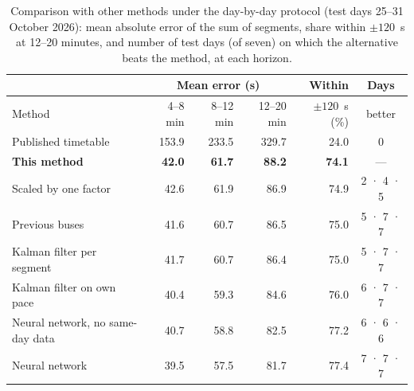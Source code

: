 \begin{table}[t]
\centering
\caption{Comparison with other methods under the day-by-day protocol (test days 25--31 October 2026): mean absolute
error of the sum of segments, share within $\pm120$~s at 12--20 minutes, and number of test days (of seven) on which
the alternative beats the method, at each horizon.}
\label{tab:methods}
\footnotesize
\setlength{\tabcolsep}{4pt}
\begin{tabular}{@{}>{\raggedright\arraybackslash}p{3.2cm}rrrrc@{}}
\toprule
& \multicolumn{3}{c}{Mean error (s)} & Within & Days \\
\cmidrule(lr){2-4}
Method & 4--8 min & 8--12 min & 12--20 min & $\pm120$~s (\%) & better \\
\midrule
Published timetable & 153.9 & 233.5 & 329.7 & 24.0 & 0 \\
\textbf{This method} & \textbf{42.0} & \textbf{61.7} & \textbf{88.2} & \textbf{74.1} & --- \\
Scaled by one factor & 42.6 & 61.9 & 86.9 & 74.9 & 2 · 4 · 5 \\
Previous buses & 41.6 & 60.7 & 86.5 & 75.0 & 5 · 7 · 7 \\
Kalman filter per segment & 41.7 & 60.7 & 86.4 & 75.0 & 5 · 7 · 7 \\
Kalman filter on own pace & 40.4 & 59.3 & 84.6 & 76.0 & 6 · 7 · 7 \\
Neural network, no same-day data & 40.7 & 58.8 & 82.5 & 77.2 & 6 · 6 · 6 \\
Neural network & 39.5 & 57.5 & 81.7 & 77.4 & 7 · 7 · 7 \\
\bottomrule
\end{tabular}
\end{table}
